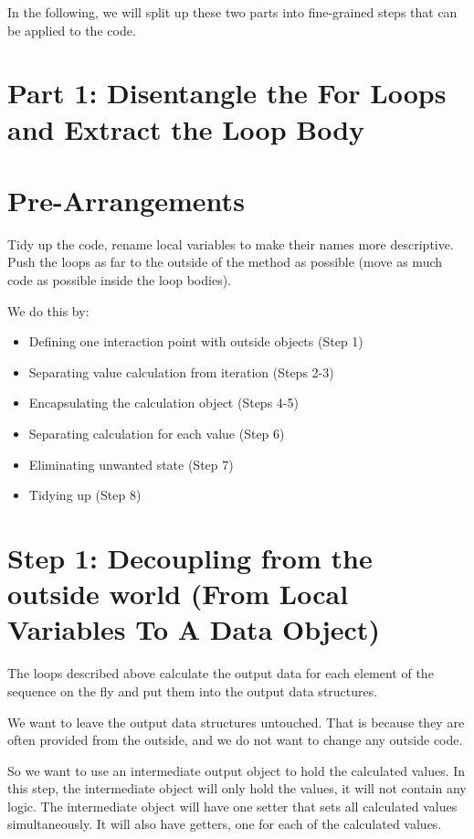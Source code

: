 \documentclass[a4paper,fleqn,titlepage,11pt]{article}
\begin{document}
In the following, we will split up these two parts into fine-grained steps that can be applied to the code.

\section{Part 1: Disentangle the For Loops and Extract the Loop Body}

\section{Pre-Arrangements}

Tidy up the code, rename local variables to make their names more descriptive.
Push the loops as far to the outside of the method as possible (move as much code as possible inside the loop bodies).

We do this by:
\begin{itemize}
	\item Defining one interaction point with outside objects (Step 1)
	\item Separating value calculation from iteration (Steps 2-3)
	\item Encapsulating the calculation object (Steps 4-5)
	\item Separating calculation for each value (Step 6)
	\item Eliminating unwanted state (Step 7)
	\item Tidying up (Step 8)
\end{itemize}

\section{Step 1: Decoupling from the outside world (From Local Variables To A Data Object)}

The loops described above calculate the output data for each element of the sequence on the fly and put them into the output data structures. 

We want to leave the output data structures untouched. That is because they are often provided from the outside, and we do not want to change any outside code.

So we want to use an intermediate output object to hold the calculated values. In this step, the intermediate object will only hold the values, it will not contain any logic. The intermediate object will have one setter that sets all calculated values simultaneously. It will also have getters, one for each of the calculated values.
\end{document}
